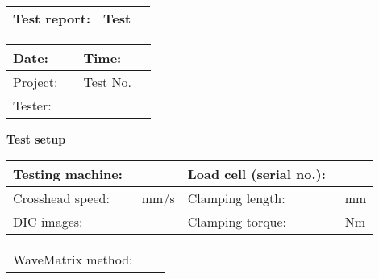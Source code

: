 



\begin{table}[H]
	\begin{tabular}{C{4cm} E{4cm} D{8.5cm}}
		\Large{\textbf{Test report:}} & \Large{\textbf{Test\testNumber}} & \Large{\waveMatrixProject}
	\end{tabular}
\end{table}
\vspace{-6mm}
\begin{table}[H]
	\begin{tabular}{C{2cm} D{6cm} | A B}
		Date:    & \testDate          & Time:    & \testTime   \\\hline
		Project: & \waveMatrixProject & Test No. & \testNumber \\\hline
		Tester:  & \tester            &          &             \\
	\end{tabular}
\end{table}

{\large{\textbf{Test setup}}}
\begin{table}[H]
	\begin{tabular}{ A B | A B}
		Testing machine: & \testingMachine      & Load cell (serial no.): & \loadCell          \\\hline
		Crosshead speed: & \crossheadSpeed~mm/s & Clamping length:        & \clampingLength~mm \\\hline
		DIC images:      & \dic                 & Clamping torque:        & \clampingTorque~Nm
	\end{tabular}
	\begin{tabular}{A B | D{8.45cm}}
		\hline
		WaveMatrix method: &  & \footnotesize{\waveMatrixMethod}
	\end{tabular}
\end{table}

